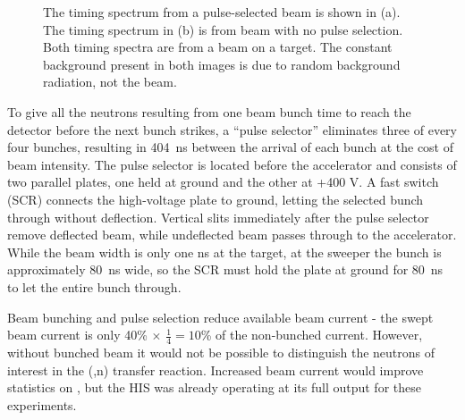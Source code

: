 \begin{figure}[htp]
\centering
{}
\caption[Timing spectra due to pulse-selected and non-pulse-selected beam.]{The timing spectrum from a pulse-selected beam is shown in (a).  The timing spectrum in (b) is from beam with no pulse selection.  Both timing spectra are from a  beam on a  target.  The constant background present in both images is due to random background radiation, not the beam.}
\label{fig:PSvsNPS_TOF}
\end{figure}

To give all the neutrons resulting from one beam bunch time to reach the detector before the next bunch strikes, a ``pulse selector'' eliminates three of every four bunches, resulting in 404~ns between the arrival of each bunch at the cost of beam intensity.  The pulse selector is located before the accelerator and consists of two parallel plates, one held at ground and the other at +400 V.  A fast switch (SCR) connects the high-voltage plate to ground, letting the selected bunch through without deflection.  Vertical slits immediately after the pulse selector remove deflected beam, while undeflected beam passes through to the accelerator.  While the beam width is only one ns at the target, at the sweeper the bunch is approximately 80~ns wide, so the SCR must hold the plate at ground for 80~ns to let the entire bunch through.

Beam bunching and pulse selection reduce available beam current - the swept beam current is only 40\% $\times$ $\frac{1}{4} = 10$\% of the non-bunched current.  However, without bunched beam it would not be possible to distinguish the neutrons of interest in the (,n) transfer reaction.  Increased beam current would improve statistics on \reaction, but the HIS was already operating at its full output for these experiments.


